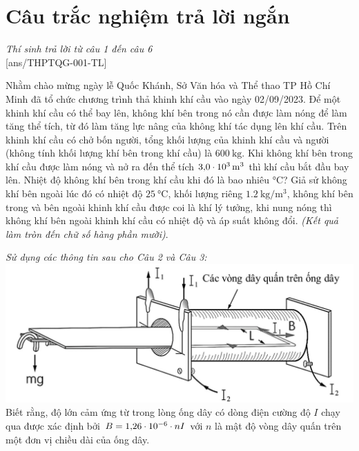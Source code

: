 \section{Câu trắc nghiệm trả lời ngắn} \textit{Thí sinh trả lời từ câu 1 đến câu 6}\\
\setcounter{ex}{0}
[ans/THPTQG-001-TL]
\begin{ex}
	Nhằm chào mừng ngày lễ Quốc Khánh, Sở Văn hóa và Thể thao TP Hồ Chí Minh đã tổ chức chương trình thả khinh khí cầu vào ngày 02/09/2023. Để một khinh khí cầu có thể bay lên, không khí bên trong nó cần được làm nóng  để làm tăng thể tích, từ đó làm tăng lực nâng của không khí tác dụng lên khí cầu. Trên khinh khí cầu có chở bốn người, tổng khối lượng của khinh khí cầu và người (không tính khối lượng khí bên trong khí cầu) là $\SI{600}{\kilogram}$. Khi không khí bên trong khí cầu được làm nóng và nở ra đến thể tích $\SI{3.0E3}{\meter^3}$ thì khí cầu bắt đầu bay lên. Nhiệt độ không khí bên trong khí cầu khi đó là bao nhiêu $\si{\celsius}$? Giả sử không khí bên ngoài lúc đó có nhiệt độ $\SI{25}{\celsius}$, khối lượng riêng $\SI{1.2}{\kilogram/\meter^3}$, không khí bên trong và bên ngoài khinh khí cầu được coi là khí lý tưởng, khi nung nóng thì không khí bên ngoài khinh khí cầu có nhiệt độ và áp suất không đổi. \textit{(Kết quả làm tròn đến chữ số hàng phần mười)}.
	\shortans[oly]{ }
	\loigiai{
		
	}
\end{ex}
\textit{Sử dụng các thông tin sau cho Câu 2 và Câu 3:}
{\includegraphics[scale=0.4]{../figs/THPTQG-001-4}}
Biết rằng, độ lớn cảm ứng từ trong lòng ống dây có dòng điện cường độ $I$ chạy qua được xác định bởi $B=\SI{1.26E-6}{}\cdot nI$ với $n$ là mật độ vòng dây quấn trên một đơn vị chiều dài của ống dây.
